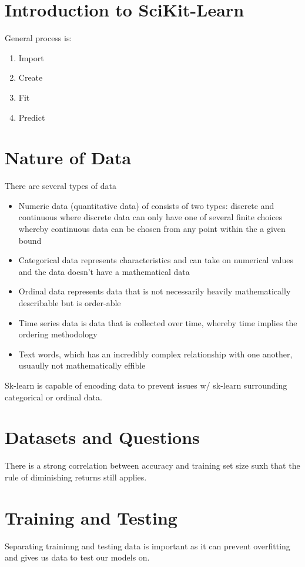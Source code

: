\documentclass{article}
\begin{document}
\section{Introduction to SciKit-Learn}

General process is:
\begin{enumerate}
\item Import
\item Create
\item Fit
\item Predict
\end{enumerate}

\section{Nature of Data}
There are several types of data
\begin{itemize}
\item Numeric data (quantitative data) of consists of two types: discrete and
continuous where discrete data can only have one of several finite choices
whereby continuous data can be chosen from any point within the a given bound
\item Categorical data represents characteristics and can take on numerical
values and the data doesn't have a mathematical data
\item Ordinal data represents data that is not necessarily
heavily mathematically describable but is order-able
\item Time series data is data that is collected over time, whereby time implies
the ordering methodology
\item Text words, which has an incredibly complex relationship with one another,
usuaully not mathematically effible
\end{itemize}

Sk-learn is capable of encoding data to prevent issues w/ sk-learn surrounding
categorical or ordinal data.

\section{Datasets and Questions}

There is a strong correlation between accuracy and training set size suxh that
the rule of diminishing returns still applies.

\section{Training and Testing}
Separating traininng and testing data is important as it can prevent overfitting
and gives us data to test our models on.
\end{document}
